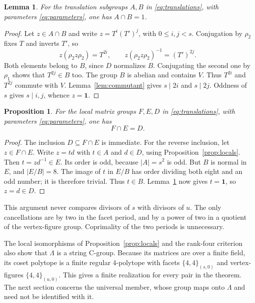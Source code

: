 \documentclass[11pt]{article}
\newtheorem{lemma}[theorem]{Lemma}
\newtheorem{proposition}[theorem]{Proposition}
\theoremstyle{definition}
\newcommand{\tor}[1]{\{4,4\}_{(#1,0)}}
\begin{document}
\begin{lemma}\label{lem:translationintersection}
For the translation subgroups $A,B$ in \eqref{eq:translations}, with
parameters \eqref{eq:parameters}, one has $A\cap B=1$.
\end{lemma}
\begin{proof}
Let $z\in A\cap B$ and write $z=T^i(T')^j$, with $0\leq i,j<s$.
Conjugation by $\rho_2$ fixes $T$ and inverts $T'$, so
\[
 z(\rho_2z\rho_2)=T^{2i},\qquad
 z(\rho_2z\rho_2)^{-1}=(T')^{2j}.
\]
Both elements belong to $B$, since $D$ normalizes $B$.
Conjugating the second one by $\rho_1$ shows that $T^{2j}\in B$ too.
The group $B$ is abelian and contains $V$. Thus $T^{2i}$ and $T^{2j}$
commute with $V$. Lemma~\ref{lem:commutant} gives $s\mid2i$ and
$s\mid2j$. Oddness of $s$ gives $s\mid i,j$, whence $z=\mathbf 1$.
\end{proof}

\begin{proposition}\label{prop:intersection}
For the local matrix groups $F,E,D$ in \eqref{eq:translations}, with
parameters \eqref{eq:parameters}, one has
\[
                               F\cap E=D.
\]
\end{proposition}
\begin{proof}
The inclusion $D\subseteq F\cap E$ is immediate.
For the reverse inclusion, let $z\in F\cap E$. Write $z=td$ with
$t\in A$ and $d\in D$, using Proposition~\ref{prop:locals}.
Then $t=zd^{-1}\in E$. Its order is odd, because $|A|=s^2$ is odd.
But $B$ is normal in $E$, and $|E/B|=8$. The image of $t$ in $E/B$
has order dividing both eight and an odd number; it is therefore trivial.
Thus $t\in B$. Lemma~\ref{lem:translationintersection} now gives
$t=\mathbf 1$, so $z=d\in D$.
\end{proof}

This argument never compares divisors of $s$ with divisors of $u$.
The only cancellations are by two in the facet period, and by a power
of two in a quotient of the vertex-figure group. Coprimality of the two
periods is unnecessary.

The local isomorphisms of Proposition~\ref{prop:locals} and the rank-four
criterion also show that $\Lambda$ is a string C-group. Because its
matrices are over a finite field, its coset polytope is a finite regular
4-polytope with facets $\tor{s}$ and vertex-figures $\tor{u}$.
This gives a finite realization for every pair in the theorem. The next
section concerns the universal member, whose group maps onto
$\Lambda$ and need not be identified with it.
\end{document}
